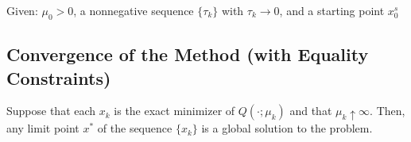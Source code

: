 \begin{algorithm}[H]
    \caption{Quadratic Penalty Method}
    \SetAlgoLined
    Given: $\mu_0 > 0$, a nonnegative sequence $\{\tau_k\}$ with $\tau_k \to 0$, and a starting point $x_0^s$\;
\end{algorithm}

\subsection{Convergence of the Method (with Equality Constraints)}

\begin{theoreme}
    Suppose that each $x_k$ is the exact minimizer of $Q(\cdot; \mu_k)$ and that $\mu_k \uparrow \infty$.
    Then, any limit point $x^*$ of the sequence $\{x_k\}$ is a global solution to the problem.
\end{theoreme}

